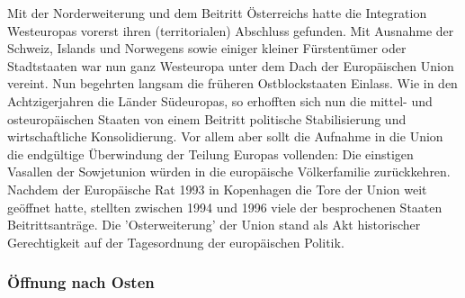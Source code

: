 \documentclass[letterpaper, 12pt]{article}
\let\tempsubsubsection\subsubsection
\renewcommand\subsubsection[1]{\vspace{0cm}\tempsubsubsection{#1}\vspace{0cm}}
\begin{document}
Mit der Norderweiterung und dem Beitritt Österreichs hatte die Integration Westeuropas vorerst ihren (territorialen) Abschluss gefunden. Mit Ausnahme der Schweiz, Islands und Norwegens sowie einiger kleiner Fürstentümer oder Stadtstaaten war nun ganz Westeuropa unter dem Dach der Europäischen Union vereint. Nun begehrten langsam die früheren Ostblockstaaten Einlass. Wie in den Achtzigerjahren die Länder Südeuropas, so erhofften sich nun die mittel- und osteuropäischen Staaten von einem Beitritt politische Stabilisierung und wirtschaftliche Konsolidierung. \clearpage
Vor allem aber sollt die Aufnahme in die Union die endgültige Überwindung der Teilung Europas vollenden: Die einstigen Vasallen der Sowjetunion würden in die europäische Völkerfamilie zurückkehren. Nachdem der Europäische Rat 1993 in Kopenhagen die Tore der Union weit geöffnet hatte, stellten zwischen 1994 und 1996 viele der besprochenen Staaten Beitrittsanträge. Die 'Osterweiterung' der Union stand als Akt historischer Gerechtigkeit auf der Tagesordnung der europäischen Politik.

\subsubsection{Öffnung nach Osten}
\end{document}
